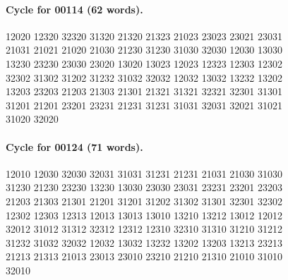 \documentclass[11pt]{article}
\theoremstyle{remark}
\numberwithin{equation}{section}
\numberwithin{table}{section}
\begin{document}
\paragraph{Cycle for 00114 (62 words).}
\begingroup\footnotesize\ttfamily\begin{flushleft}
12020 12320 32320 31320 21320 21323 21023 23023 23021 23031\\
21031 21021 21020 21030 21230 31230 31030 32030 12030 13030\\
13230 23230 23030 23020 13020 13023 12023 12323 12303 12302\\
32302 31302 31202 31232 31032 32032 12032 13032 13232 13202\\
13203 23203 21203 21303 21301 21321 31321 32321 32301 31301\\
31201 21201 23201 23231 21231 31231 31031 32031 32021 31021\\
31020 32020\\
\end{flushleft}\endgroup
\paragraph{Cycle for 00124 (71 words).}
\begingroup\footnotesize\ttfamily\begin{flushleft}
12010 12030 32030 32031 31031 31231 21231 21031 21030 31030\\
31230 21230 23230 13230 13030 23030 23031 23231 23201 23203\\
21203 21303 21301 21201 31201 31202 31302 31301 32301 32302\\
12302 12303 12313 12013 13013 13010 13210 13212 13012 12012\\
32012 31012 31312 32312 12312 12310 32310 31310 31210 31212\\
31232 31032 32032 12032 13032 13232 13202 13203 13213 23213\\
21213 21313 21013 23013 23010 23210 21210 21310 21010 31010\\
32010\\
\end{flushleft}\endgroup
\end{document}
